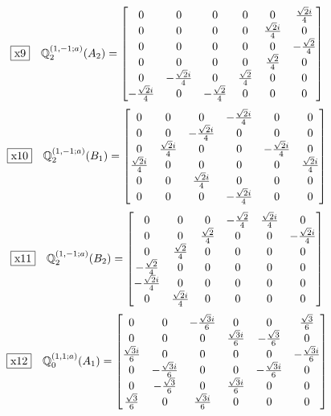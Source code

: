 \documentclass[fleqn,10pt,landscape]{jsarticle}
\begin{document}
\begin{dmath*}
\fbox{x9}\quad \mathbb{Q}_{2}^{(1,-1;a)}(A_{2})=\begin{bmatrix} 0 & 0 & 0 & 0 & 0 & \frac{\sqrt{2} i}{4} \\ 0 & 0 & 0 & 0 & \frac{\sqrt{2} i}{4} & 0 \\ 0 & 0 & 0 & 0 & 0 & - \frac{\sqrt{2}}{4} \\ 0 & 0 & 0 & 0 & \frac{\sqrt{2}}{4} & 0 \\ 0 & - \frac{\sqrt{2} i}{4} & 0 & \frac{\sqrt{2}}{4} & 0 & 0 \\ - \frac{\sqrt{2} i}{4} & 0 & - \frac{\sqrt{2}}{4} & 0 & 0 & 0 \end{bmatrix}
\end{dmath*}
\begin{dmath*}
\fbox{x10}\quad \mathbb{Q}_{2}^{(1,-1;a)}(B_{1})=\begin{bmatrix} 0 & 0 & 0 & - \frac{\sqrt{2} i}{4} & 0 & 0 \\ 0 & 0 & - \frac{\sqrt{2} i}{4} & 0 & 0 & 0 \\ 0 & \frac{\sqrt{2} i}{4} & 0 & 0 & - \frac{\sqrt{2} i}{4} & 0 \\ \frac{\sqrt{2} i}{4} & 0 & 0 & 0 & 0 & \frac{\sqrt{2} i}{4} \\ 0 & 0 & \frac{\sqrt{2} i}{4} & 0 & 0 & 0 \\ 0 & 0 & 0 & - \frac{\sqrt{2} i}{4} & 0 & 0 \end{bmatrix}
\end{dmath*}
\begin{dmath*}
\fbox{x11}\quad \mathbb{Q}_{2}^{(1,-1;a)}(B_{2})=\begin{bmatrix} 0 & 0 & 0 & - \frac{\sqrt{2}}{4} & \frac{\sqrt{2} i}{4} & 0 \\ 0 & 0 & \frac{\sqrt{2}}{4} & 0 & 0 & - \frac{\sqrt{2} i}{4} \\ 0 & \frac{\sqrt{2}}{4} & 0 & 0 & 0 & 0 \\ - \frac{\sqrt{2}}{4} & 0 & 0 & 0 & 0 & 0 \\ - \frac{\sqrt{2} i}{4} & 0 & 0 & 0 & 0 & 0 \\ 0 & \frac{\sqrt{2} i}{4} & 0 & 0 & 0 & 0 \end{bmatrix}
\end{dmath*}
\begin{dmath*}
\fbox{x12}\quad \mathbb{Q}_{0}^{(1,1;a)}(A_{1})=\begin{bmatrix} 0 & 0 & - \frac{\sqrt{3} i}{6} & 0 & 0 & \frac{\sqrt{3}}{6} \\ 0 & 0 & 0 & \frac{\sqrt{3} i}{6} & - \frac{\sqrt{3}}{6} & 0 \\ \frac{\sqrt{3} i}{6} & 0 & 0 & 0 & 0 & - \frac{\sqrt{3} i}{6} \\ 0 & - \frac{\sqrt{3} i}{6} & 0 & 0 & - \frac{\sqrt{3} i}{6} & 0 \\ 0 & - \frac{\sqrt{3}}{6} & 0 & \frac{\sqrt{3} i}{6} & 0 & 0 \\ \frac{\sqrt{3}}{6} & 0 & \frac{\sqrt{3} i}{6} & 0 & 0 & 0 \end{bmatrix}
\end{dmath*}
\end{document}
